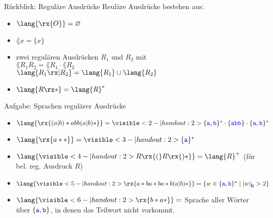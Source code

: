 \begin{frame}{Rückblick: Reguläre Ausdrücke}
	Reuläre Ausdrücke bestehen aus:
	\begin{itemize}[<+->]
		\item {} $\lang{\rx{O}} = \emptyset$\pause
		\item {}  $\lang{x}=\{x\}$ \pause
		\item zwei regulären Ausdrücken $R_1$ und $R_2$ mit\\ 
			 $\lang{R_1 R_2} = \lang{R_1} \cdot \lang{R_2}$\\
			 $\lang{R_1 \rx| R_2} = \lang{R_1} \cup \lang{R_2}$ \pause
		\item {} $\lang{R\rx*} = \lang{R}^*$\pause
	\end{itemize}
\end{frame}
\begin{frame}{Aufgabe: Sprachen regulärer Ausdrücke}
	\begin{itemize}
		\item $\lang{\rx{(a|b)*abb(a|b)*}} = \visible<2-|handout:2>{\{\word a, \word b\}^* \cdot \{\word a\word b\word b\} \cdot \{\word a, \word b\}^*}$
		\item $\lang{\rx{a**}} = \visible<3-|handout:2>{\{\word a\}^*}$
		\item $\lang{\visible<4-|handout:2>{R\rx{(}R\rx{)*}}} = \lang{R}^+$ \quad (für bel. reg. Ausdruck $R$)
		\item $\lang{\visible<5-|handout:2>{\rx{a*ba*ba*b(a|b)*}}} = \set{ w \in \{\word a, \word b\}^* \Mid \size{w}_{\word b} > 2 } $
		\item $\lang{\visible<6-|handout:2>{\rx{b*a*}}} =$ Sprache aller Wörter über $\left\{\hbox{\textcolor{blue}{\texttt{a}}}, \hbox{\textcolor{blue}{\texttt{b}}}\right\}$, in denen das Teilwort  nicht vorkommt.
	\end{itemize}
\end{frame}







